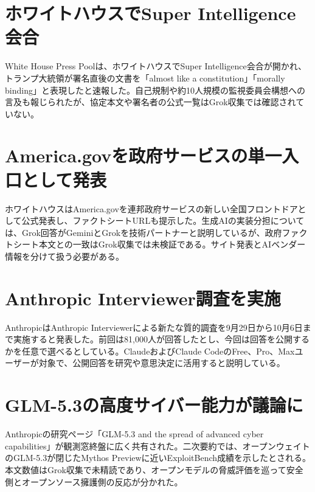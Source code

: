 \section{ホワイトハウスでSuper Intelligence会合}
White House Press Poolは、ホワイトハウスでSuper Intelligence会合が開かれ、トランプ大統領が署名直後の文書を「almost like a constitution」「morally binding」と表現したと速報した。自己規制や約10人規模の監視委員会構想への言及も報じられたが、協定本文や署名者の公式一覧はGrok収集では確認されていない。

\section{America.govを政府サービスの単一入口として発表}
ホワイトハウスはAmerica.govを連邦政府サービスの新しい全国フロントドアとして公式発表し、ファクトシートURLも提示した。生成AIの実装分担については、Grok回答がGeminiとGrokを技術パートナーと説明しているが、政府ファクトシート本文との一致はGrok収集では未検証である。サイト発表とAIベンダー情報を分けて扱う必要がある。

\section{Anthropic Interviewer調査を実施}
AnthropicはAnthropic Interviewerによる新たな質的調査を9月29日から10月6日まで実施すると発表した。前回は81,000人が回答したとし、今回は回答を公開するかを任意で選べるとしている。ClaudeおよびClaude CodeのFree、Pro、Maxユーザーが対象で、公開回答を研究や意思決定に活用すると説明している。

\section{GLM-5.3の高度サイバー能力が議論に}
Anthropicの研究ページ「GLM-5.3 and the spread of advanced cyber capabilities」が観測窓終盤に広く共有された。二次要約では、オープンウェイトのGLM-5.3が閉じたMythos Previewに近いExploitBench成績を示したとされる。本文数値はGrok収集で未精読であり、オープンモデルの脅威評価を巡って安全側とオープンソース擁護側の反応が分かれた。

